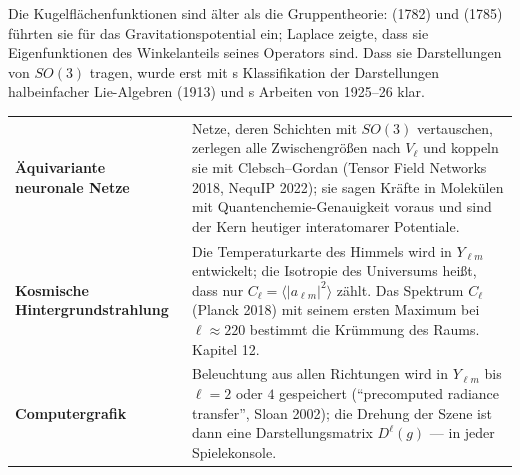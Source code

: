 \begin{geschichte}
Die Kugelflächenfunktionen sind älter als die Gruppentheorie:  (1782) und  (1785) führten sie für das Gravitationspotential ein; Laplace zeigte, dass sie Eigenfunktionen des Winkelanteils seines Operators sind. Dass sie Darstellungen von $SO(3)$ tragen, wurde erst mit s Klassifikation der Darstellungen halbeinfacher Lie-Algebren (1913) und s Arbeiten von 1925--26 klar.

\begin{center}
\begin{minipage}{0.9\textwidth}
\end{minipage}
\end{center}
\end{geschichte}

\begin{forschung}
\begin{center}
{\small
\renewcommand{\arraystretch}{1.45}
\begin{tabular}{@{}P{3.0cm}P{5.2cm}@{}}
\toprule
\textbf{Äquivariante neuronale Netze} & Netze, deren Schichten mit $SO(3)$ vertauschen, zerlegen alle Zwischengrößen nach $V_\ell$ und koppeln sie mit Clebsch--Gordan (Tensor Field Networks 2018, NequIP 2022); sie sagen Kräfte in Molekülen mit Quantenchemie-Genauigkeit voraus und sind der Kern heutiger interatomarer Potentiale.\\
\textbf{Kosmische Hintergrundstrahlung} & Die Temperaturkarte des Himmels wird in $Y_{\ell m}$ entwickelt; die Isotropie des Universums heißt, dass nur $C_\ell = \langle|a_{\ell m}|^{2}\rangle$ zählt. Das Spektrum $C_\ell$ (Planck 2018) mit seinem ersten Maximum bei $\ell\approx220$ bestimmt die Krümmung des Raums. Kapitel 12.\\
\textbf{Computergrafik} & Beleuchtung aus allen Richtungen wird in $Y_{\ell m}$ bis $\ell = 2$ oder $4$ gespeichert (\enquote{precomputed radiance transfer}, Sloan 2002); die Drehung der Szene ist dann eine Darstellungsmatrix $D^{\ell}(g)$ --- in jeder Spielekonsole.\\
\bottomrule
\end{tabular}}
\end{center}
\end{forschung}

